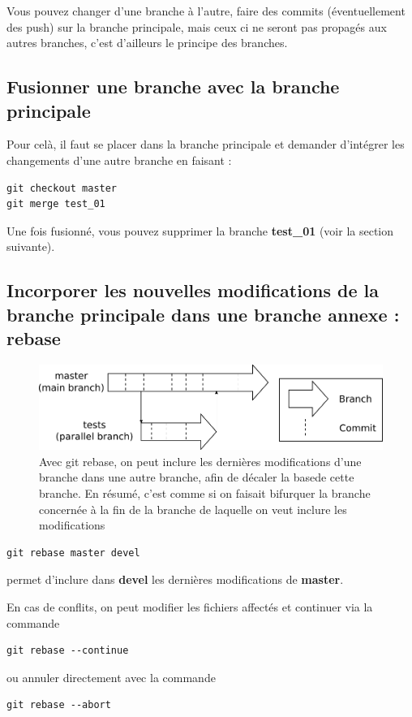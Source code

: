 \documentclass[a4paper,twoside]{article}
\begin{document}
\begin{attention}
Vous pouvez changer d'une branche à l'autre, faire des commits (éventuellement des push) sur la branche principale, mais ceux ci ne seront pas propagés aux autres branches, c'est d'ailleurs le principe des branches. 
\end{attention}

\subsection{Fusionner une branche avec la branche principale}
Pour celà, il faut se placer dans la branche principale et demander d'intégrer les changements d'une autre branche en faisant : 
\begin{verbatim}
git checkout master
git merge test_01
\end{verbatim}

Une fois fusionné, vous pouvez supprimer la branche \textbf{test\_01} (voir la section suivante).

\subsection{Incorporer les nouvelles modifications de la branche principale dans une branche annexe : rebase}
\begin{figure}[htb]
\centering
\includegraphics[width=0.75\linewidth]{figure/branchs.pdf}
\caption{Avec git rebase, on peut inclure les dernières modifications d'une branche dans une autre branche, afin de décaler la \og base\fg de cette branche. En résumé, c'est comme si on faisait bifurquer la branche concernée à la fin de la branche de laquelle on veut inclure les modifications}
\end{figure}

\begin{verbatim}
git rebase master devel
\end{verbatim}
permet d'inclure dans \textbf{devel} les dernières modifications de \textbf{master}.

\bigskip

En cas de conflits, on peut modifier les fichiers affectés et continuer via la commande 
\begin{verbatim}
git rebase --continue
\end{verbatim}
ou annuler directement avec la commande
\begin{verbatim}
git rebase --abort
\end{verbatim}
\end{document}
